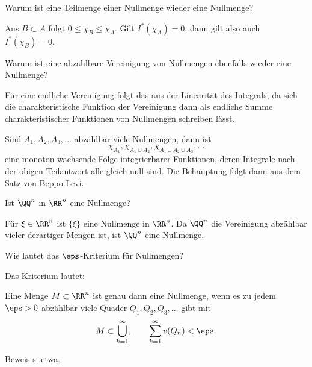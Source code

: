 \begin{frage}\label{11_teilnull}
  Warum ist eine Teilmenge einer Nullmenge wieder eine Nullmenge?
\end{frage}

\begin{antwort}
  Aus $B\subset A$ folgt $0\le \chi_B \le \chi_A$. 
  Gilt $I^*(\chi_A)=0$, dann gilt also auch $I^*(\chi_B)=0$. \AntEnd
\end{antwort}

\begin{frage}
  Warum ist eine abzählbare Vereinigung von Nullmengen ebenfalls wieder 
  eine Nullmenge?
\end{frage}

\begin{antwort}
  Für eine endliche Vereinigung folgt das aus der Linearität des 
  Integrals, da sich die charakteristische Funktion der Vereinigung 
  dann als endliche Summe charakteristischer Funktionen 
  von Nullmengen schreiben lässt.  

  Sind $A_1, A_2, A_3,\ldots$ abzählbar viele Nullmengen, dann ist 
  \[
  \chi_{A_1}, \chi_{A_1\cup A_2}, \chi_{A_1\cup A_2 \cup A_3} ,\ldots 
  \]
  eine monoton wachsende Folge integrierbarer Funktionen, deren Integrale 
  nach der obigen Teilantwort alle gleich null sind. Die Behauptung folgt 
  dann aus dem Satz von Beppo Levi.
  \AntEnd
\end{antwort}

\begin{frage}
  Ist $\QQ^n$ in $\RR^n$ eine Nullmenge?
\end{frage}

\begin{antwort}
  Für $\xi\in \RR^n$ ist $\{ \xi \}$ eine Nullmenge in $\RR^n$. 
  Da $\QQ^n$ die Vereinigung abzählbar vieler derartiger Mengen ist, 
  ist $\QQ^n$ eine Nullmenge.
  \AntEnd  
\end{antwort}



\begin{frage}
  Wie lautet das $\eps$-Kriterium für Nullmengen?
\end{frage}

\begin{antwort}
  Das Kriterium lautet:
  
  \begin{Satz}%
    Eine Menge $M\subset \RR^n$ ist genau dann eine Nullmenge, wenn 
    es zu jedem $\eps>0$ abzählbar viele Quader $Q_1,Q_2,Q_3,\ldots $ gibt mit 
    \[
    M \subset \bigcup_{k=1}^\infty, \qquad 
    \sum_{k=1}^\infty v(Q_n) < \eps. 
    \]
  \end{Satz}%
  Beweis s. etwa\citep{Koenig}. \AntEnd
\end{antwort}


